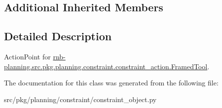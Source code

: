 \subsection*{Additional Inherited Members}


\subsection{Detailed Description}
Action\+Point for \hyperlink{classrnb-planning_1_1src_1_1pkg_1_1planning_1_1constraint_1_1constraint__action_1_1_framed_tool}{rnb-\/planning.\+src.\+pkg.\+planning.\+constraint.\+constraint\+\_\+action.\+Framed\+Tool}. 

The documentation for this class was generated from the following file\+:\begin{DoxyCompactItemize}
\item 
src/pkg/planning/constraint/constraint\+\_\+object.\+py\end{DoxyCompactItemize}

